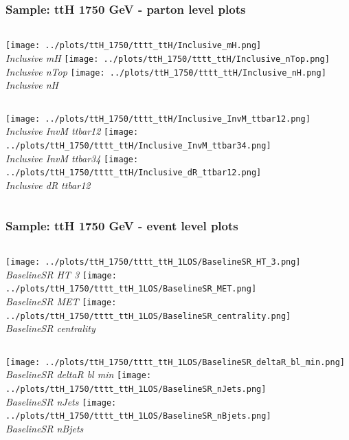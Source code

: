 \documentclass{beamer}
\begin{document}
\begin{frame}
\frametitle{Sample: ttH 1750 GeV - parton level plots}
\begin{columns}
\texttt{[image: ../plots/ttH\_1750/tttt\_ttH/Inclusive\_mH.png]}\\
\textit{\small Inclusive mH}
\texttt{[image: ../plots/ttH\_1750/tttt\_ttH/Inclusive\_nTop.png]}\\
\textit{\small Inclusive nTop}
\texttt{[image: ../plots/ttH\_1750/tttt\_ttH/Inclusive\_nH.png]}\\
\textit{\small Inclusive nH}
\end{columns}
\begin{columns}
\texttt{[image: ../plots/ttH\_1750/tttt\_ttH/Inclusive\_InvM\_ttbar12.png]}\\
\textit{\small Inclusive InvM ttbar12}
\texttt{[image: ../plots/ttH\_1750/tttt\_ttH/Inclusive\_InvM\_ttbar34.png]}\\
\textit{\small Inclusive InvM ttbar34}
\texttt{[image: ../plots/ttH\_1750/tttt\_ttH/Inclusive\_dR\_ttbar12.png]}\\
\textit{\small Inclusive dR ttbar12}
\end{columns}
\end{frame}
\begin{frame}
\frametitle{Sample: ttH 1750 GeV - event level plots}
\begin{columns}
\texttt{[image: ../plots/ttH\_1750/tttt\_ttH\_1LOS/BaselineSR\_HT\_3.png]}\\
\textit{\small BaselineSR HT 3}
\texttt{[image: ../plots/ttH\_1750/tttt\_ttH\_1LOS/BaselineSR\_MET.png]}\\
\textit{\small BaselineSR MET}
\texttt{[image: ../plots/ttH\_1750/tttt\_ttH\_1LOS/BaselineSR\_centrality.png]}\\
\textit{\small BaselineSR centrality}
\end{columns}
\begin{columns}
\texttt{[image: ../plots/ttH\_1750/tttt\_ttH\_1LOS/BaselineSR\_deltaR\_bl\_min.png]}\\
\textit{\small BaselineSR deltaR bl min}
\texttt{[image: ../plots/ttH\_1750/tttt\_ttH\_1LOS/BaselineSR\_nJets.png]}\\
\textit{\small BaselineSR nJets}
\texttt{[image: ../plots/ttH\_1750/tttt\_ttH\_1LOS/BaselineSR\_nBjets.png]}\\
\textit{\small BaselineSR nBjets}
\end{columns}
\end{frame}
\end{document}
